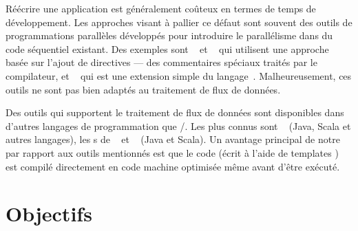 \begin{introduction}

R\'e\'ecrire une application est g\'en\'eralement co\^uteux en termes de temps de d\'eveloppement. Les approches visant \`a pallier ce d\'efaut sont souvent des outils de programmations parall\`eles d\'evelopp\'es pour introduire le parall\'elisme dans du code s\'equentiel existant. Des exemples sont ~\citep{ChandraEtAl01} et ~\citep{farber2016parallel} qui utilisent une approche bas\'ee sur l'ajout de directives --- des commentaires sp\'eciaux trait\'es par le compilateur, et ~\citep{leiserson1998programming} qui est une extension simple du langage~. Malheureusement, ces outils ne sont pas bien adapt\'es au traitement de flux de donn\'ees.


Des outils qui supportent le traitement de flux de donn\'ees sont disponibles dans d'autres langages de programmation que /. Les plus connus sont ~\citep{frampton2015mastering} (Java, Scala et autres langages), les s de ~\citep{warburton2014java} et ~\citep{flinkReferenceEnLigne} (Java et Scala). Un avantage principal de notre  par rapport aux outils mentionn\'es est que le code (\'ecrit \`a l'aide de templates ) est compil\'e directement en code machine optimis\'ee m\^eme avant d'\^etre ex\'ecut\'e. 


\section*{Objectifs}



\end{introduction}
